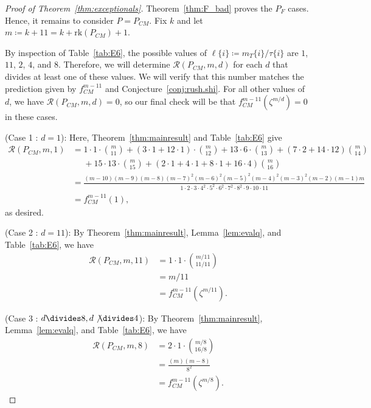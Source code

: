 \documentclass[12pt]{amsart}
\theoremstyle{definition}
\theoremstyle{remark}
\numberwithin{equation}{section}
\newcommand{\rank}{\ensuremath{\mathrm{rk}}}
\begin{document}
\begin{proof}[Proof of Theorem~\ref{thm:exceptionals}]
Theorem~\ref{thm:F_bad} proves the $P_F$ cases. Hence, it remains to consider $P = P_{CM}$.
Fix $k$ and let $m \coloneqq k +11   = k + \rank(P_{CM}) + 1$. 

By inspection of Table~\ref{tab:E6}, the possible values of $\ell\{i\} \coloneqq m_T\{i\}/\tau\{i\}$ are $1$, $11$, $2$, $4$, and $8$. Therefore, we will determine $\mathcal{R}(P_{CM},m,d)$ for each $d$ that divides at least one of these values. We will verify that this number matches the prediction given by $f^{m-11}_{CM}$ and Conjecture~\ref{conj:rush.shi}. For all other values of $d$, we have $\mathcal{R}(P_{CM},m,d) = 0$, so our final check will be that  $f^{m-11}_{CM}(\zeta^{m/d}) = 0$ in these cases.

\smallskip

\noindent
{\sf (Case 1 : $d = 1$)}:
Here, Theorem~\ref{thm:mainresult} and Table~\ref{tab:E6} give
\tiny
\begin{align*}
\mathcal{R}(P_{CM},m,1) &= 1 \cdot 1 \cdot \binom{m}{11} + (3 \cdot 1  + 12 \cdot 1)  \cdot \binom{m}{12} + 13 \cdot 6 \cdot \binom{m}{13} + (7\cdot 2 + 14 \cdot 12) \binom{m}{14}  \\ &\ \ \ \ \ \ + 15 \cdot 13 \cdot \binom{m}{15} + (2 \cdot 1 + 4 \cdot 1 + 8 \cdot 1 + 16 \cdot 4) \binom{m}{16} \\
&= \frac{(m-10)(m-9)(m-8)(m-7)^2(m-6)^2(m-5)^2(m-4)^2(m-3)^2(m-2)(m-1)m}{1\cdot 2\cdot 3\cdot 4^2 \cdot 5^2 \cdot 6^2 \cdot 7^2 \cdot 8^2 \cdot 9 \cdot 10 \cdot 11} \\
&= f_{CM}^{m-11}(1),
\end{align*}
\normalsize
as desired.

\smallskip
\noindent
{\sf (Case 2 : $d = 11$)}:
By Theorem~\ref{thm:mainresult}, Lemma~\ref{lem:evalq}, and Table~\ref{tab:E6}, we have
\begin{align*}
\mathcal{R}(P_{CM},m,11) &= 1 \cdot 1 \cdot \binom{m/11}{11/11} \\
&= m/11 \\ 
&= f_{CM}^{m-11}(\zeta^{m/11}).
\end{align*}

\smallskip
\noindent
{\sf (Case 3 : $d \divides 8, d \not \divides 4$)}:
By Theorem~\ref{thm:mainresult}, Lemma~\ref{lem:evalq}, and Table~\ref{tab:E6}, we have
\begin{align*}
\mathcal{R}(P_{CM},m,8) &= 2 \cdot 1 \cdot \binom{m/8}{16/8} \\
&= \frac{(m)(m-8)}{8^2} \\
&= f_{CM}^{m-11}(\zeta^{m/8}).
\end{align*}


\end{proof}
\end{document}

